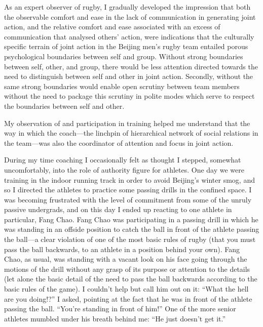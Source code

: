 \begin{CJK}{UTF8}{gbsn}
  As an expert observer of rugby, I gradually developed the impression that both the observable comfort and ease in the lack of communication in generating joint action, and the relative comfort and ease associated with an excess of communication that analysed others' action, were indications that the culturally specific terrain of joint action in the Beijing men's rugby team entailed porous psychological boundaries between self and group.  Without strong boundaries between self, other, and group, there would be less attention directed towards the need to distinguish between self and other in joint action.  Secondly, without the same strong boundaries would enable open scrutiny between team members without the need to package this scrutiny in polite modes which serve to respect the boundaries between self and other.



  My observation of and participation in training helped me understand that the way in which the coach---the linchpin of hierarchical network of social relations in the team---was also the coordinator of attention and focus in joint action.

  During my time coaching I occasionally felt as thought I stepped, somewhat uncomfortably, into the role of authority figure for athletes.  One day we were training in the indoor running track in order to avoid Beijing's winter smog, and so I directed the athletes to practice some passing drills in the confined space.  I was becoming frustrated with the level of commitment from some of the unruly passive undergrads, and on this day I ended up reacting to one athlete in particular, Fang Chao.  Fang Chao was participating in a passing drill in which he was standing in an offside position to catch the ball in front of the athlete passing the ball---a clear violation of one of the most basic rules of rugby (that you must pass the ball backwards, to an athlete in a position behind your own).  Fang Chao, as usual, was standing with a vacant look on his face going through the motions of the drill without any grasp of its purpose or attention to the details (let alone the basic detail of the need to pass the ball backwards according to the basic rules of the game).  I couldn't help but call him out on it: ``What the hell are you doing!?'' I asked, pointing at the fact that he was in front of the athlete passing the ball.  ``You're standing in front of him!'' One of the more senior athletes mumbled under his breath behind me: ``He just doesn't get it.''


\end{CJK}
